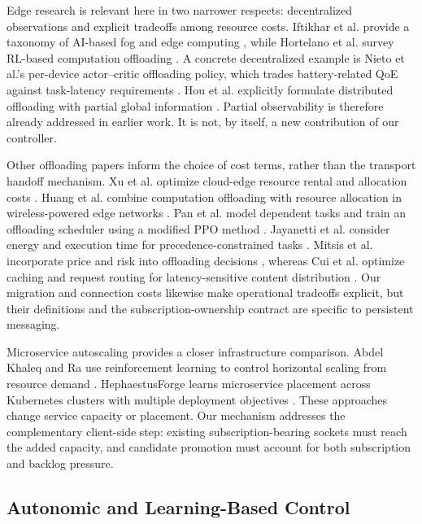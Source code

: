\documentclass[manuscript,nonacm]{acmart}
\begin{document}
Edge research is relevant here in two narrower respects: decentralized
observations and explicit tradeoffs among resource costs. Iftikhar et al.
provide a taxonomy of AI-based fog and edge computing \cite{Iftikhar2023EdgeAI},
while Hortelano et al. survey RL-based computation offloading
\cite{Hortelano2023RLOffloading}. A concrete decentralized example is Nieto
et al.'s per-device actor--critic offloading policy, which trades battery-related
QoE against task-latency requirements \cite{Nieto2024DRLOffloading}. Hou et al.
explicitly formulate distributed offloading with partial global information
\cite{Hou2023PODRL}. Partial observability is therefore already addressed in
earlier work. It is not, by itself, a new contribution of our controller.

Other offloading papers inform the choice of cost terms, rather than the
transport handoff mechanism. Xu et al. optimize cloud-edge resource rental and
allocation costs \cite{Xu2022CloudEdgeResource}. Huang et al. combine
computation offloading with resource allocation in wireless-powered edge
networks \cite{Huang2020Offloading}. Pan et al. model dependent tasks and train
an offloading scheduler using a modified PPO method \cite{Pan2023ICNOffloading}.
Jayanetti et al. consider energy and execution time for precedence-constrained
tasks \cite{Jayanetti2022EdgeCloudScheduling}. Mitsis et al. incorporate price
and risk into offloading decisions \cite{Mitsis2022RiskOffloading}, whereas Cui
et al. optimize caching and request routing for latency-sensitive content
distribution \cite{Cui2023IoTEdgeCloud}. Our migration and connection costs
likewise make operational tradeoffs explicit, but their definitions and the
subscription-ownership contract are specific to persistent messaging.

Microservice autoscaling provides a closer infrastructure comparison.
Abdel Khaleq and Ra use reinforcement learning to control horizontal scaling
from resource demand \cite{AbdelKhaleq2021Autoscaling}. HephaestusForge learns
microservice placement across Kubernetes clusters with multiple deployment
objectives \cite{Santos2025HephaestusForge}. These approaches change service
capacity or placement. Our mechanism addresses the complementary client-side
step: existing subscription-bearing sockets must reach the added capacity,
and candidate promotion must account for both subscription and backlog pressure.

\subsection{Autonomic and Learning-Based Control}
\end{document}

